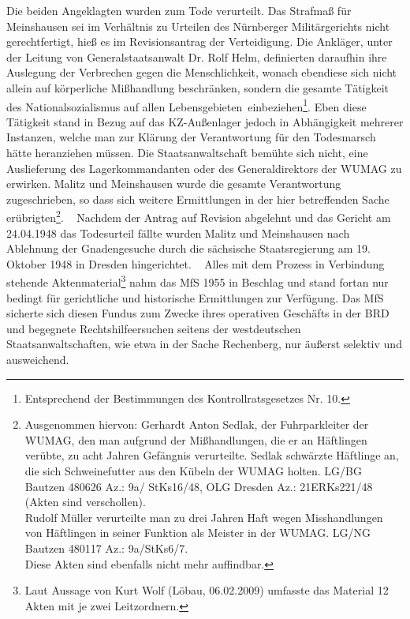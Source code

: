 Die beiden Angeklagten wurden zum Tode verurteilt. \glqq Das Strafmaß für Meinshausen sei im Verhältnis zu Urteilen des Nürnberger Militärgerichts nicht gerechtfertigt\grqq, hieß es im Revisionsantrag der Verteidigung. Die Ankläger, unter der Leitung von Generalstaatsanwalt Dr. Rolf Helm, definierten daraufhin ihre Auslegung der \glqq Verbrechen gegen die Menschlichkeit\grqq, wonach ebendiese sich nicht allein auf körperliche Mißhandlung beschränken, sondern \glqq die gesamte Tätigkeit des Nationalsozialismus auf allen Lebensgebieten\grqq~einbeziehen\footnote{Entsprechend der Bestimmungen des Kontrollratsgesetzes Nr. 10.}.
Eben diese Tätigkeit stand in Bezug auf das KZ-Außenlager jedoch in Abhängigkeit mehrerer Instanzen, welche man zur Klärung der Verantwortung für den Todesmarsch hätte heranziehen müssen. Die Staatsanwaltschaft bemühte sich nicht, eine Auslieferung des Lagerkommandanten oder des Generaldirektors der WUMAG zu erwirken. Malitz und Meinshausen wurde die gesamte Verantwortung zugeschrieben, so dass sich weitere Ermittlungen in der hier betreffenden Sache erübrigten\footnote{Ausgenommen hiervon: Gerhardt Anton Sedlak, der Fuhrparkleiter der WUMAG, den man aufgrund der Mißhandlungen, die er an Häftlingen verübte, zu acht Jahren Gefängnis verurteilte. Sedlak schwärzte Häftlinge an, die sich Schweinefutter aus den Kübeln der WUMAG holten. LG/BG Bautzen 480626 Az.: 9a/ StKs16/48, OLG Dresden Az.: 21ERKs221/48 (Akten sind verschollen). \\ Rudolf Müller verurteilte man zu drei Jahren Haft wegen Misshandlungen von Häftlingen in seiner Funktion als Meister in der WUMAG. LG/NG Bautzen 480117 Az.: 9a/StKs6/7. \\
Diese Akten sind ebenfalls nicht mehr auffindbar.}.
~\newline
Nachdem der Antrag auf Revision abgelehnt und das Gericht am 24.04.1948 das Todesurteil fällte wurden Malitz und Meinshausen nach Ablehnung der Gnadengesuche durch die sächsische Staatsregierung am 19. Oktober 1948 in Dresden hingerichtet. 
~\newline
Alles mit dem Prozess in Verbindung stehende Aktenmaterial\footnote{Laut Aussage von Kurt Wolf (Löbau, 06.02.2009) umfasste das Material 12 Akten mit je zwei Leitzordnern.} nahm das MfS 1955 in Beschlag und stand fortan nur bedingt für gerichtliche und historische Ermittlungen zur Verfügung.
Das MfS sicherte sich diesen Fundus zum Zwecke ihres operativen Geschäfts in der BRD und begegnete Rechtshilfeersuchen seitens der westdeutschen Staatsanwaltschaften, wie etwa in der Sache Rechenberg, nur äußerst selektiv und ausweichend.

